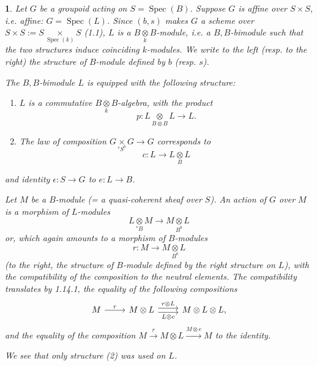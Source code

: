 \documentclass{article}
\newtheorem{env}[term]{}
\DeclareMathOperator{\spec}{\text{Spec}}
\begin{document}
  \begin{env}
    Let $G$ be a groupoid acting on $S= \spec (B)$. Suppose $G$ is affine over $S\times S$, i.e. affine: 
    $G = \spec (L)$. Since $(b,s)$ makes $G$ a scheme over $S \times S := S \underset {\spec (k)} \times S$ (1.1),
    $L$ is a $B\underset k\otimes B$-module, i.e. a $B,B$-bimodule such that the two structures induce coinciding 
    $k$-modules. We write to the left (resp. to the right) the structure of $B$-module defined by $b$ (resp. $s$). 

    The $B,B$-bimodule $L$ is equipped with the following structure: 
    \begin{enumerate}
      \item $L$ is a commutative $B \underset k \otimes B$-algebra, with the product 
        $$ p : L \underset {B \otimes B} \otimes L \rightarrow L.$$
      \item The law of composition $G \underset {^sS^b} \times G \rightarrow G$ corresponds to 
        $$ c: L \rightarrow L \underset B \otimes L$$
    \end{enumerate}
    and identity $\epsilon:S \rightarrow G$ to $e: L \rightarrow B$.

    Let $M$ be a $B$-module (= a quasi-coherent sheaf over $S$). An action of $G$ over $M$ is a morphism of 
    $L$-modules $$ L \underset {^s B} \otimes M \rightarrow M \underset{B ^ b} \otimes L $$ or, which again amounts to 
    a morphism of $B$-modules $$r: M \rightarrow M \underset {B^b} \otimes L$$ (to the right, the structure of 
    $B$-module defined by the right structure on $L$), with the compatibility of the composition to the 
    neutral elements. The compatibility translates by 1.14.1, the equality of the following compositions
    $$ \begin{tikzcd} M \arrow[r,"r"] & 
      M \otimes L \arrow[r,shift left,"r \otimes L"]\arrow [r,shift right,"L \otimes c"'] & 
      M \otimes L \otimes L, \end{tikzcd} $$
    and the equality of the composition $M \xrightarrow r M \otimes L \xrightarrow {M \otimes e}  M$ to the identity.

    We see that only structure (2) was used on $L$.
  \end{env}
\end{document}

